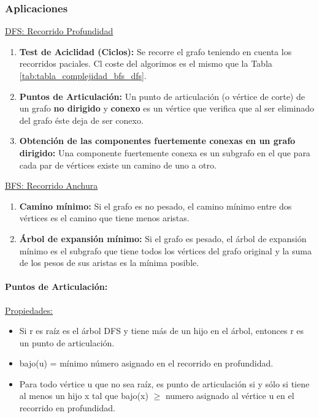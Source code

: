 \documentclass[../main.tex]{subfiles}
\begin{document}
            \subsubsection{Aplicaciones}
                \underline{DFS: Recorrido Profundidad}
                \begin{enumerate}
                    \item \textbf{Test de Aciclidad (Ciclos):} Se recorre el grafo teniendo en cuenta los recorridos paciales. Cl coste del algorimos es el mismo que la Tabla \ref{tab:tabla_complejidad_bfs_dfs}.
                    \item  \textbf{Puntos de Articulación:} Un punto de articulación (o vértice de corte) de un grafo \textbf{no dirigido} y \textbf{conexo} es un vértice que verifica que al ser eliminado del grafo éste deja de ser conexo.
                    \item \textbf{Obtención de las componentes fuertemente conexas en un grafo dirigido:} Una componente fuertemente conexa es un subgrafo en el que para cada par de vértices existe un camino de uno a otro.
                \end{enumerate}

                \underline{BFS: Recorrido Anchura}
                \begin{enumerate}
                    \item \textbf{Camino mínimo:} Si el grafo es no pesado, el camino mínimo entre dos vértices es el camino que tiene menos aristas.
                    \item \textbf{Árbol de expansión mínimo:} Si el grafo es pesado, el árbol de expansión mínimo es el subgrafo que tiene todos los vértices del grafo original y la suma de los pesos de sus aristas es la mínima posible.
                \end{enumerate}

                \paragraph{Puntos de Articulación:}
                \underline{Propiedades:}
                \begin{itemize}
                    \item Si r es raíz es el árbol DFS y tiene más de un hijo en el árbol, entonces r es un punto de articulación.
                    \item bajo(u) = mínimo número asignado en el recorrido en profundidad.
                    \item Para todo vértice u que no sea raíz, es punto de articulación si y sólo si tiene al menos un hijo x tal que bajo(x) $\geq$ numero asignado al vértice u en el recorrido en profundidad.
                \end{itemize}
\end{document}
